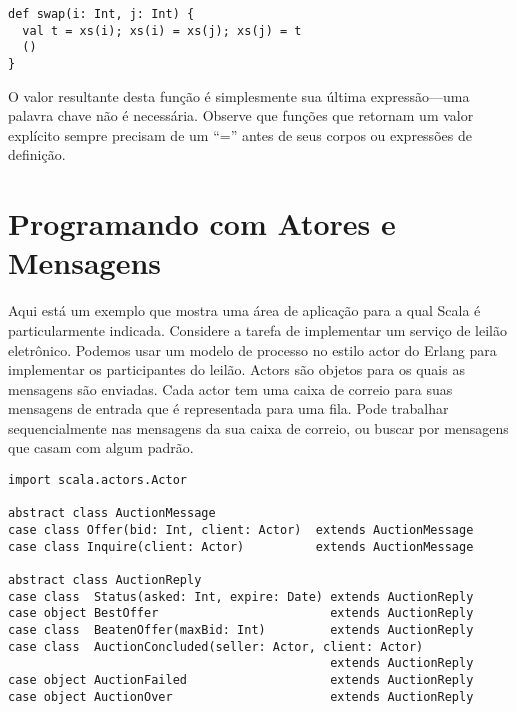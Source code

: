 \begin{lstlisting}
def swap(i: Int, j: Int) {
  val t = xs(i); xs(i) = xs(j); xs(j) = t
  ()
}
\end{lstlisting}

O valor resultante desta função é simplesmente sua última expressão---uma
palavra chave \lstinline@return@ não é necessária. Observe que funções 
que retornam um valor explícito sempre precisam de um ``='' antes de
seus corpos ou expressões de definição.

\chapter{Programando com Atores e Mensagens}
\label{chap:example-auction}
Aqui está um exemplo que mostra uma área de aplicação para a qual Scala 
é particularmente indicada. Considere a tarefa de implementar um serviço
de leilão eletrônico. Podemos usar um modelo de processo no estilo 
actor do Erlang para implementar os participantes do leilão. Actors são 
objetos para os quais as mensagens são enviadas. Cada actor tem uma caixa de correio 
para suas mensagens de entrada que é representada para uma fila. Pode
trabalhar sequencialmente nas mensagens da sua caixa de correio, ou buscar 
por mensagens que casam com algum padrão. 
\begin{lstlisting}[style=floating,label=fig:simple-auction-msgs,caption=Message
    Classes for an Auction Service]
import scala.actors.Actor

abstract class AuctionMessage
case class Offer(bid: Int, client: Actor)  extends AuctionMessage
case class Inquire(client: Actor)          extends AuctionMessage

abstract class AuctionReply
case class  Status(asked: Int, expire: Date) extends AuctionReply
case object BestOffer                        extends AuctionReply
case class  BeatenOffer(maxBid: Int)         extends AuctionReply
case class  AuctionConcluded(seller: Actor, client: Actor) 
                                             extends AuctionReply
case object AuctionFailed                    extends AuctionReply
case object AuctionOver                      extends AuctionReply
\end{lstlisting}
